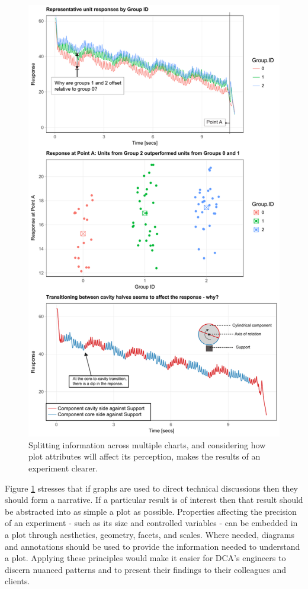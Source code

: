 \documentclass[11pt,a4paper,article]{memoir} %
\begin{document}
\begin{figure}
\includegraphics[width=\textwidth]{better_charts.pdf}
\caption{Splitting information across multiple charts, and considering how plot attributes will affect its perception, makes the results of an experiment clearer.}
\label{fig:better_chart}
\end{figure}

Figure \ref{fig:better_chart} stresses that if graphs are used to direct technical discussions then they should form a narrative. If a particular result is of interest then that result should be abstracted into as simple a plot as possible. Properties affecting the precision of an experiment - such as its size and controlled variables - can be embedded in a plot through aesthetics, geometry, facets, and scales. Where needed, diagrams and annotations should be used to provide the information needed to understand a plot. Applying these principles would make it easier for DCA's engineers to discern nuanced patterns and to present their findings to their colleagues and clients.
\end{document}
